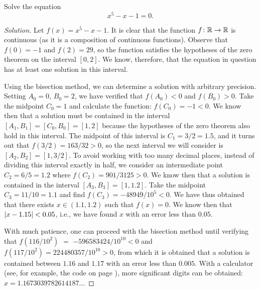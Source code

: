 \begin{example}\label{ex:75445}
Solve the equation
\[
  x^5-x-1=0.
\]
\end{example}
%
\begin{proof}[Solution]
Let $f(x) = x^5-x-1$. It is clear that the function $f\colon {\mathbb R}\to {\mathbb R}$
is continuous (as it is a composition of continuous functions).
Observe that $f(0) = -1$ and $f(2)=29$, so the function
satisfies the hypotheses of the zero theorem on the interval $[0,2]$.
We know, therefore, that the equation in question has at least one solution
in this interval.

Using the bisection method, we can determine a solution
with arbitrary precision. Setting $A_0=0$, $B_0=2$, we have verified that
$f(A_0)<0$ and $f(B_0)>0$.
Take the midpoint
$C_0=1$ and calculate the function: $f(C_0)=-1 < 0$. We know
then that a solution must be contained in the interval
$[A_1,B_1] = [C_0,B_0] = [1,2]$ because the hypotheses
of the zero theorem also hold in this interval.
The midpoint of this interval is $C_1=3/2 = 1.5$,
and it turns out that $f(3/2) = 163/32>0$, so the next interval
we will consider is $[A_2,B_2]=[1,3/2]$.
To avoid working with too many decimal places, instead of dividing
this interval exactly in half, we consider an intermediate point
$C_2 = 6/5 = 1.2$ where $f(C_2)=901/3125>0$.
We know then that a solution is contained in the interval
$[A_3,B_3] = [1,1.2]$. Take the midpoint $C_3=11/10=1.1$
and find $f(C_3) = -48949/10^5 <0$. We have thus obtained
that there exists $x\in (1.1,1.2)$ such that $f(x)=0$. We know then
that ${\left|x-1.15\right|} < 0.05$, i.e., we have found $x$ with an error
less than $0.05$.

With much patience, one can proceed
with the bisection method until verifying
that $f(116/10^2)$ $=$ $-596583424/10^{10}<0$ and
$f(117/10^2)=224480357/10^{10}>0$, from which
it is obtained that a solution is contained between $1.16$ and $1.17$ with an
error
less than $0.005$.
With a calculator (see, for example, the code on page \pageref{code:bisection}),
more significant digits can be obtained: $x=1.1673039782614187\ldots$
\end{proof}

